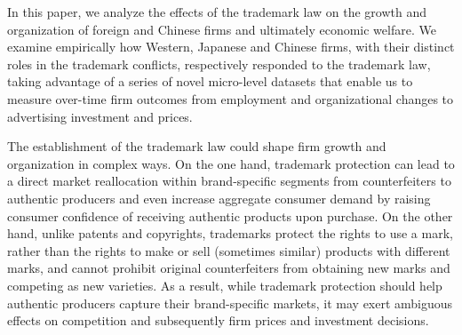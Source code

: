 \documentclass[12pt]{article}
\begin{document}

In this paper, we analyze the effects of the trademark law on the growth and organization of foreign and Chinese firms and ultimately economic welfare. We examine empirically how Western, Japanese and Chinese firms, with their distinct roles in the trademark conflicts, respectively responded to the trademark law, taking advantage of a series of novel micro-level datasets that enable us to measure over-time firm outcomes from employment and organizational changes to advertising investment and prices. 

The establishment of the trademark law could shape firm growth and organization in complex ways. On the one hand, trademark protection can lead to a direct market reallocation within brand-specific segments from counterfeiters to authentic producers and even increase aggregate consumer demand by raising consumer confidence of receiving authentic products upon purchase. On the other hand, unlike patents and copyrights, trademarks protect the rights to use a mark, rather than the rights to make or sell (sometimes similar) products with different marks, and cannot prohibit original counterfeiters from obtaining new marks and competing as new varieties. As a result, while trademark protection should help authentic producers capture their brand-specific markets, it may exert ambiguous effects on competition and subsequently firm prices and investment decisions.

\end{document}
